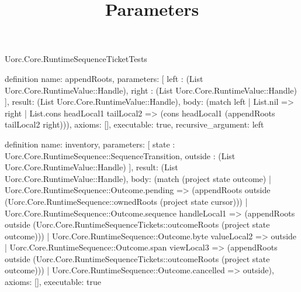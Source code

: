 \begin{lexlean}{Uorc.Core.RuntimeSequenceTicketTests}
\title{Parameters}
\begin{semanticmodule}
definition{
  name: appendRoots,
  parameters: [
    left : (List Uorc.Core.RuntimeValue::Handle),
    right : (List Uorc.Core.RuntimeValue::Handle)
  ],
  result: (List Uorc.Core.RuntimeValue::Handle),
  body: (match left
    | List.nil => right
    | List.cons headLocal1 tailLocal2 => (cons headLocal1 (appendRoots tailLocal2 right))),
  axioms: [],
  executable: true,
  recursive_argument: left
}

definition{
  name: inventory,
  parameters: [
    state : Uorc.Core.RuntimeSequence::SequenceTransition,
    outside : (List Uorc.Core.RuntimeValue::Handle)
  ],
  result: (List Uorc.Core.RuntimeValue::Handle),
  body: (match (project state outcome)
    | Uorc.Core.RuntimeSequence::Outcome.pending => (appendRoots outside (Uorc.Core.RuntimeSequence::ownedRoots (project state cursor)))
    | Uorc.Core.RuntimeSequence::Outcome.sequence handleLocal1 => (appendRoots outside (Uorc.Core.RuntimeSequenceTickets::outcomeRoots (project state outcome)))
    | Uorc.Core.RuntimeSequence::Outcome.byte valueLocal2 => outside
    | Uorc.Core.RuntimeSequence::Outcome.span viewLocal3 => (appendRoots outside (Uorc.Core.RuntimeSequenceTickets::outcomeRoots (project state outcome)))
    | Uorc.Core.RuntimeSequence::Outcome.cancelled => outside),
  axioms: [],
  executable: true
}


\end{semanticmodule}
\end{lexlean}
